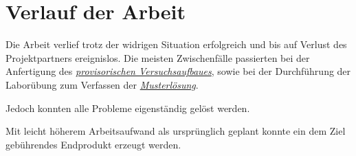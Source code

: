 \chapter{Verlauf der Arbeit}

Die Arbeit verlief trotz der widrigen Situation erfolgreich und bis auf Verlust des Projektpartners ereignislos.
Die meisten Zwischenfälle passierten bei der Anfertigung des \hyperref[provi]{\textit{provisorischen Versuchsaufbaues}}, sowie bei der Durchführung der Laborübung zum Verfassen der \hyperref[muster]{\textit{Musterlösung}}.

Jedoch konnten alle Probleme eigenständig gelöst werden.

Mit leicht höherem Arbeitsaufwand als ursprünglich geplant konnte ein dem Ziel gebührendes Endprodukt erzeugt werden.